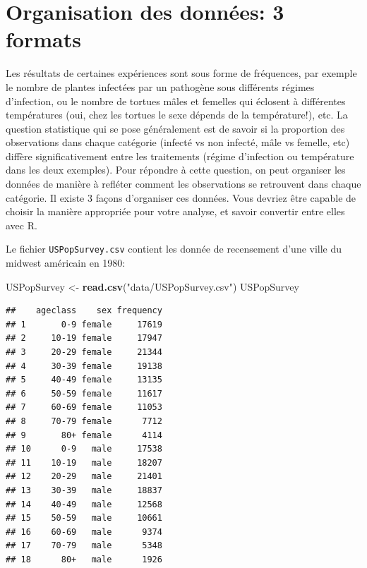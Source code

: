 \documentclass[
  12pt,
]{book}
\newenvironment{Shaded}{\begin{snugshade}}{\end{snugshade}}
\newcommand{\KeywordTok}[1]{\textcolor[rgb]{0.13,0.29,0.53}{\textbf{#1}}}
\newcommand{\NormalTok}[1]{#1}
\newcommand{\StringTok}[1]{\textcolor[rgb]{0.31,0.60,0.02}{#1}}
\begin{document}
\hypertarget{organisation-des-donnuxe9es-3-formats}{%
\section{Organisation des données: 3 formats}\label{organisation-des-donnuxe9es-3-formats}}

Les résultats de certaines expériences sont sous forme de fréquences, par exemple le nombre de plantes infectées par un pathogène sous différents régimes d'infection, ou le nombre de tortues mâles et femelles qui éclosent à différentes températures (oui, chez les tortues le sexe dépends de la température!), etc. La question statistique qui se pose généralement est de savoir si la proportion des observations dans chaque catégorie (infecté vs non infecté, mâle vs femelle, etc) diffère significativement entre les traitements (régime d'infection ou température dans les deux exemples). Pour répondre à cette question, on peut organiser les données de manière à refléter comment les observations se retrouvent dans chaque catégorie. Il existe 3 façons d'organiser ces données. Vous devriez être capable de choisir la manière appropriée pour votre analyse, et savoir convertir entre elles avec R.

Le fichier \texttt{USPopSurvey.csv} contient les donnée de recensement d'une ville du midwest américain en 1980:

\begin{Shaded}
\begin{Highlighting}[]
\NormalTok{USPopSurvey \textless{}{-}}\StringTok{ }\KeywordTok{read.csv}\NormalTok{(}\StringTok{"data/USPopSurvey.csv"}\NormalTok{)}
\NormalTok{USPopSurvey}
\end{Highlighting}
\end{Shaded}

\begin{verbatim}
##    ageclass    sex frequency
## 1       0-9 female     17619
## 2     10-19 female     17947
## 3     20-29 female     21344
## 4     30-39 female     19138
## 5     40-49 female     13135
## 6     50-59 female     11617
## 7     60-69 female     11053
## 8     70-79 female      7712
## 9       80+ female      4114
## 10      0-9   male     17538
## 11    10-19   male     18207
## 12    20-29   male     21401
## 13    30-39   male     18837
## 14    40-49   male     12568
## 15    50-59   male     10661
## 16    60-69   male      9374
## 17    70-79   male      5348
## 18      80+   male      1926
\end{verbatim}
\end{document}
